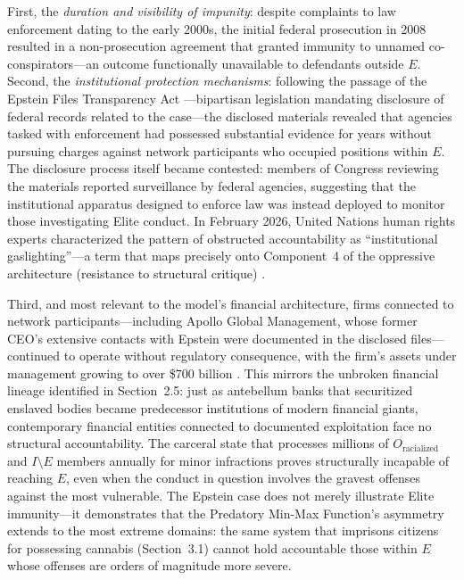 \documentclass[12pt,openany]{book}
\begin{document}
First, the \textit{duration and visibility of impunity}: despite complaints to law enforcement dating to the early 2000s, the initial federal prosecution in 2008 resulted in a non-prosecution agreement that granted immunity to unnamed co-conspirators---an outcome functionally unavailable to defendants outside $E$. Second, the \textit{institutional protection mechanisms}: following the passage of the Epstein Files Transparency Act \cite{epsteinact}---bipartisan legislation mandating disclosure of federal records related to the case---the disclosed materials revealed that agencies tasked with enforcement had possessed substantial evidence for years without pursuing charges against network participants who occupied positions within $E$. The disclosure process itself became contested: members of Congress reviewing the materials reported surveillance by federal agencies, suggesting that the institutional apparatus designed to enforce law was instead deployed to monitor those investigating Elite conduct. In February 2026, United Nations human rights experts characterized the pattern of obstructed accountability as ``institutional gaslighting''---a term that maps precisely onto Component~4 of the oppressive architecture (resistance to structural critique) \cite{ohchr2026}.

Third, and most relevant to the model's financial architecture, firms connected to network participants---including Apollo Global Management, whose former CEO's extensive contacts with Epstein were documented in the disclosed files---continued to operate without regulatory consequence, with the firm's assets under management growing to over \$700 billion \cite{apolloepstein}. This mirrors the unbroken financial lineage identified in Section~2.5: just as antebellum banks that securitized enslaved bodies became predecessor institutions of modern financial giants, contemporary financial entities connected to documented exploitation face no structural accountability. The carceral state that processes millions of $O_{\text{racialized}}$ and $I \setminus E$ members annually for minor infractions proves structurally incapable of reaching $E$, even when the conduct in question involves the gravest offenses against the most vulnerable. The Epstein case does not merely illustrate Elite immunity---it demonstrates that the Predatory Min-Max Function's asymmetry extends to the most extreme domains: the same system that imprisons citizens for possessing cannabis (Section~3.1) cannot hold accountable those within $E$ whose offenses are orders of magnitude more severe.
\end{document}
